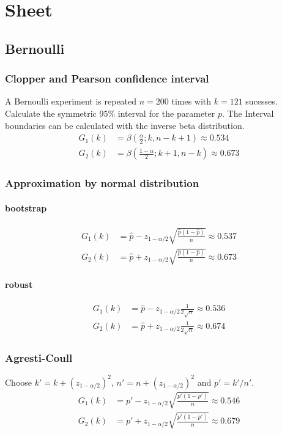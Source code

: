 \section{Sheet}
\subsection{Bernoulli}
\subsubsection{Clopper and Pearson confidence interval}
A Bernoulli experiment is repeated $n=200$ times with $k=121$ sucesses. Calculate the symmetric $95\%$ interval
for the  parameter $p$.
The Interval boundaries can be calculated with the inverse beta distribution.
\begin{align}
    G_1\left(k\right)&=\beta\left(\frac{\alpha}{2};k,n-k+1\right)\approx0.534
    \\G_2\left(k\right)&=\beta\left(\frac{1-\alpha}{2};k+1,n-k\right)\approx0.673
\end{align}
\subsubsection{Approximation by normal distribution}
\paragraph{bootstrap}
\begin{align}
    G_1\left(k\right)&=\hat{p}-z_{1-\alpha/2}\sqrt{\frac{\hat{p}\left(1-\hat{p}\right)}{n}}\approx0.537
    \\G_2\left(k\right)&=\hat{p}+z_{1-\alpha/2}\sqrt{\frac{\hat{p}\left(1-\hat{p}\right)}{n}}\approx0.673
\end{align}
\paragraph{robust}
\begin{align}
    G_1\left(k\right)&=\hat{p}-z_{1-\alpha/2}\frac{1}{2\sqrt{n}}\approx0.536
    \\G_2\left(k\right)&=\hat{p}+z_{1-\alpha/2}\frac{1}{2\sqrt{n}}\approx0.674
\end{align}
\subsubsection{Agresti-Coull}
Choose $k'=k+\left(z_{1-\alpha/2}\right)^2$, $n'=n+\left(z_{1-\alpha/2}\right)^2$ and $p'=k'/n'$.
\begin{align}
    G_1\left(k\right)&=p'-z_{1-\alpha/2}\sqrt{\frac{p'\left(1-p'\right)}{n}}\approx0.546
    \\G_2\left(k\right)&=p'+z_{1-\alpha/2}\sqrt{\frac{p'\left(1-p'\right)}{n}}\approx0.679
\end{align}
